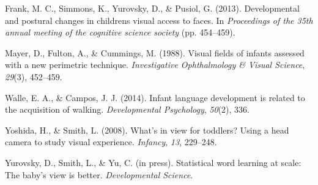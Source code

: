 \documentclass[10pt, letterpaper]{article}
\begin{document}
\hypertarget{ref-frank2013}{}
Frank, M. C., Simmons, K., Yurovsky, D., \& Pusiol, G. (2013).
Developmental and postural changes in childrens visual access to faces.
In \emph{Proceedings of the 35th annual meeting of the cognitive science
society} (pp. 454--459).

\hypertarget{ref-mayer1988}{}
Mayer, D., Fulton, A., \& Cummings, M. (1988). Visual fields of infants
assessed with a new perimetric technique. \emph{Investigative
Ophthalmology \& Visual Science}, \emph{29}(3), 452--459.

\hypertarget{ref-walle2014}{}
Walle, E. A., \& Campos, J. J. (2014). Infant language development is
related to the acquisition of walking. \emph{Developmental Psychology},
\emph{50}(2), 336.

\hypertarget{ref-yoshida2008}{}
Yoshida, H., \& Smith, L. (2008). What's in view for toddlers? Using a
head camera to study visual experience. \emph{Infancy}, \emph{13},
229--248.

\hypertarget{ref-yurovsky2012}{}
Yurovsky, D., Smith, L., \& Yu, C. (in press). Statistical word learning
at scale: The baby's view is better. \emph{Developmental Science}.
\end{document}
